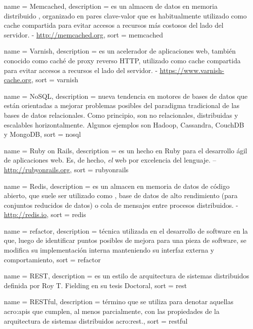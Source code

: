  {
  name = {Memcached},
  description = {es un almacen de datos en memoria distribuido , organizado en pares clave-valor que es habitualmente utilizado como cache compartida para evitar accesos a recursos más costosos del lado del servidor. - \url{http://memcached.org}},
  sort = {memcached}
}

 {
  name = {Varnish},
  description = {es un acelerador de aplicaciones web, también conocido como caché de proxy reverso HTTP, utilizado como cache compartida para evitar accesos a recursos el lado del servidor. - \url{https://www.varnish-cache.org}},
  sort = {varnish}
}

 {
  name = {NoSQL},
  description = {nueva tendencia en motores de bases de datos que están orientadas a mejorar problemas posibles del paradigma tradicional de las bases de datos relacionales. Como principio, son no relacionales, distribuidas y escalables horizontalmente. Algunos ejemplos son Hadoop, Cassandra, CouchDB y MongoDB},
  sort = {nosql}
}

 {
  name = {Ruby on Rails},
  description = {es un  hecho en Ruby para el desarrollo ágil de aplicaciones web. Es, de hecho, \textit{el}  web por excelencia del lenguaje. – \url{http://rubyonrails.org}},
  sort = {rubyonrails}
}

 {
  name = {Redis},
  description = {es un almacen en memoria de datos de código abierto, que suele ser utilizado como , base de datos de alto rendimiento (para conjuntos reducidos de datos) o cola de mensajes entre procesos distribuidos. - \url{http://redis.io}},
  sort = {redis}
}

 {
  name = {refactor},
  description = {técnica utilizada en el desarrollo de software en la que, luego de identificar puntos posibles de mejora para una pieza de software, se modifica su implementación interna manteniendo su interfaz externa y comportamiento},
  sort = {refactor}
}

 {
  name = {REST},
  description = {es un estilo de arquitectura de sistemas distribuidos definida por Roy T. Fielding en su tesis Doctoral},
  sort = {rest}
}

 {
  name = {RESTful},
  description = {término que se utiliza para denotar aquellas \glspl{acro:api} que cumplen, al menos parcialmente, con las propiedades de la arquitectura de sistemas distribuidos \gls{acro:rest}.},
  sort = {restful}
}

